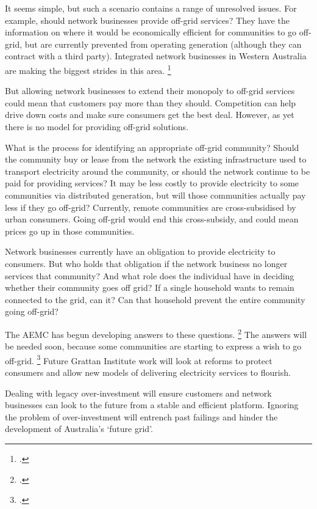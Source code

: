 \documentclass[FrontPage]{grattan}
\begin{document}
It seems simple, but such a scenario contains a range of unresolved issues. For example, should network businesses provide off-grid services? They have the information on where it would be economically efficient for communities to go off-grid, but are currently prevented from operating generation (although they can contract with a third party). Integrated network businesses in Western Australia are making the biggest strides in this area.%
\footcite{WoodBlowers-2015-Fair-pricing-for-WA}

But allowing network businesses to extend their monopoly to off-grid services could mean that customers pay more than they should. Competition can help drive down costs and make sure consumers get the best deal. However, as yet there is no model for providing off-grid solutions. 

What is the process for identifying an appropriate off-grid community? Should the community buy or lease from the network the existing infrastructure used to transport electricity around the community, or should the network continue to be paid for providing services? It may be less costly to provide electricity to some communities via distributed generation, but will those communities actually pay less if they go off-grid? Currently, remote communities are cross-subsidised by urban consumers. Going off-grid would end this cross-subsidy, and could mean prices go up in those communities.

Network businesses currently have an obligation to provide electricity to consumers. But who holds that obligation if the network business no longer services that community? And what role does the individual have in deciding whether their community goes off grid? If a single household wants to remain connected to the grid, can it? Can that household prevent the entire community going off-grid?

The AEMC has begun developing answers to these questions.%
\footcite{AEMC2017OffGridAlternatives} 
The answers will be needed soon, because some communities are starting to express a wish to go off-grid.%
\footcite{Green2015Yackandandah}
Future Grattan Institute work will look at reforms to protect consumers and allow new models of delivering electricity services to flourish. 

Dealing with legacy over-investment will ensure customers and network businesses can look to the future from a stable and efficient platform. Ignoring the problem of over-investment will entrench past failings and hinder the development of Australia's `future grid'. 
\end{document}
